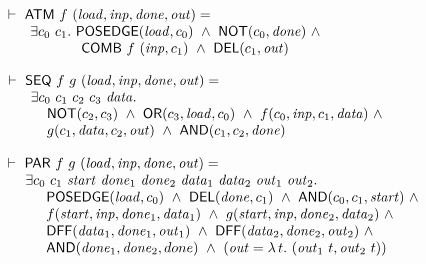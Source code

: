 \documentclass{llncs}
\begin{document}
\begin{footnotesize}
\smallskip


$
\begin{array}{l}
\TURNST\ \DEF{ATM}\ f\ (\VAR{load,inp,done,out}) =\\
\phantom{\TURNST\ ~~}    \exists c_0~ c_1.\ \DEF{POSEDGE} (\VAR{load}, c_0)\ \AND \ 
\DEF{NOT} (c_0, \VAR{done})\ \AND\\
\phantom{\TURNST\ ~~\exists c_0, c_1.\ }  \DEF{COMB}\ f\ (\VAR{inp},c_1)\ \AND\ \DEF{DEL} (c_1,\VAR{out})
\end{array}
$

\smallskip

$
\begin{array}{l}
\TURNST\ \DEF{SEQ}\ f\ g\ (\VAR{load,inp,done,out}) = \\
\phantom{\TURNST\ ~~} \exists c_0~ c_1~ c_2~ c_3~ \VAR{data}.\\
\phantom{\TURNST\ ~~\exists~}                      \DEF{NOT} (c_2,c_3) \ \AND \ 
                      \DEF{OR} (c_3,\VAR{load},c_0) \ \AND \  f (c_0,\VAR{inp},c_1,\VAR{data}) \ \AND \\
\phantom{\TURNST\ ~~ \exists~} 
        g (c_1,\VAR{data},c_2,\VAR{out})\ \AND\ 
        \DEF{AND} (c_1,c_2,\VAR{done}) 
\end{array}
$

\smallskip

$
\begin{array}{l}
\TURNST\ \DEF{PAR}\ f\ g\ (\VAR{load,inp,done,out}) = \\
\phantom{\TURNST\ ~}     \exists c_0~c_1~\VAR{start}~\sVAR{done}{1}~\sVAR{done}{2}~
                                 \sVAR{data}{1}~\sVAR{data}{2}~\sVAR{out}{1}~\sVAR{out}{2}.\\
\phantom{\TURNST\ ~~ \exists~}
       \DEF{POSEDGE} (\VAR{load},c_0)\ \AND\  
       \DEF{DEL} (\VAR{done},c_1)\ \AND \ 
       \DEF{AND} (c_0,c_1,\VAR{start})\ \AND\\
\phantom{\TURNST\ ~~ \exists~}
       f (\VAR{start},\VAR{inp},\sVAR{done}{1},\sVAR{data}{1})\ \AND \ 
       g (\VAR{start},\VAR{inp},\sVAR{done}{2},\sVAR{data}{2})\ \AND\\
\phantom{\TURNST\ ~~ \exists~}
       \DEF{DFF} (\sVAR{data}{1},\sVAR{done}{1},\sVAR{out}{1})\ \AND \  
       \DEF{DFF} (\sVAR{data}{2},\sVAR{done}{2},\sVAR{out}{2})\ \AND\\
\phantom{\TURNST\ ~~ \exists~}
       \DEF{AND} (\sVAR{done}{1},\sVAR{done}{2},done)\ \AND \ 
       (\VAR{out} = \LAMBDA{t}{(\sVAR{out}{1}\ t,\sVAR{out}{2}\ t)})
\end{array}
$


\end{footnotesize}
\end{document}
